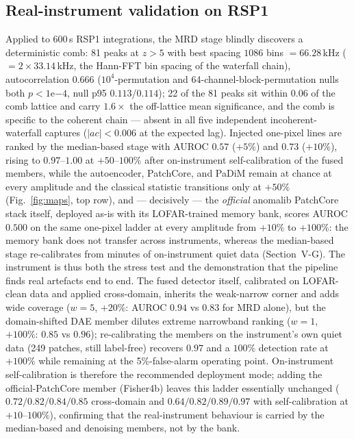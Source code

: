 \documentclass[journal]{IEEEtran}
\begin{document}
\subsection{Real-instrument validation on RSP1}
\label{sec:rsp1val}
Applied to 600\,s RSP1 integrations, the MRD stage blindly discovers a
deterministic comb: 81 peaks at $z>5$ with best spacing $1086$ bins
$=66.28$\,kHz ($=2\times33.14$\,kHz, the Hann-FFT bin spacing of the
waterfall chain), autocorrelation $0.666$ ($10^{4}$-permutation and 64-channel-block-permutation
nulls both $p<1\mathrm{e}{-4}$, null p95 $0.113$/$0.114$); 22 of the 81 peaks sit
within $0.06$ of the comb lattice and carry $1.6\times$ the off-lattice mean
significance, and the comb is specific to the coherent chain --- absent in all
five independent incoherent-waterfall captures ($|{ac}|<0.006$ at the expected
lag).  Injected one-pixel lines are
ranked by the median-based stage with AUROC $0.57$ ($+5\%$) and $0.73$
($+10\%$), rising to $0.97$--$1.00$ at $+50$--$100\%$ after on-instrument
self-calibration of the fused members, while the
autoencoder, PatchCore, and PaDiM remain at chance at every amplitude and
the classical statistic transitions only at $+50\%$
(Fig.~\ref{fig:maps}, top row), and --- decisively --- the \emph{official}
anomalib PatchCore stack itself, deployed as-is with its LOFAR-trained
memory bank, scores AUROC $0.500$ on the same one-pixel ladder at every
amplitude from $+10\%$ to $+100\%$: the memory bank does not transfer
across instruments, whereas the median-based stage re-calibrates from
minutes of on-instrument quiet data (Section~V-G).  The instrument is thus both the stress test
and the demonstration that the pipeline finds real artefacts end to end.  The fused detector itself, calibrated on LOFAR-clean data and
applied cross-domain, inherits the weak-narrow corner and adds wide
coverage ($w{=}5$, $+20\%$: AUROC $0.94$ vs $0.83$ for MRD alone), but the
domain-shifted DAE member dilutes extreme narrowband ranking
($w{=}1$, $+100\%$: $0.85$ vs $0.96$); re-calibrating the members on the
instrument's own quiet data (249 patches, still label-free) recovers
$0.97$ and a $100\%$ detection rate at $+100\%$ while remaining at the
5\%-false-alarm operating point.  On-instrument self-calibration is
therefore the recommended deployment mode; adding the official-PatchCore
member (Fisher4b) leaves this ladder essentially unchanged
($0.72/0.82/0.84/0.85$ cross-domain and $0.64/0.82/0.89/0.97$ with
self-calibration at $+10$--$100\%$), confirming that the real-instrument
behaviour is carried by the median-based and denoising members, not by the
bank.
\end{document}
